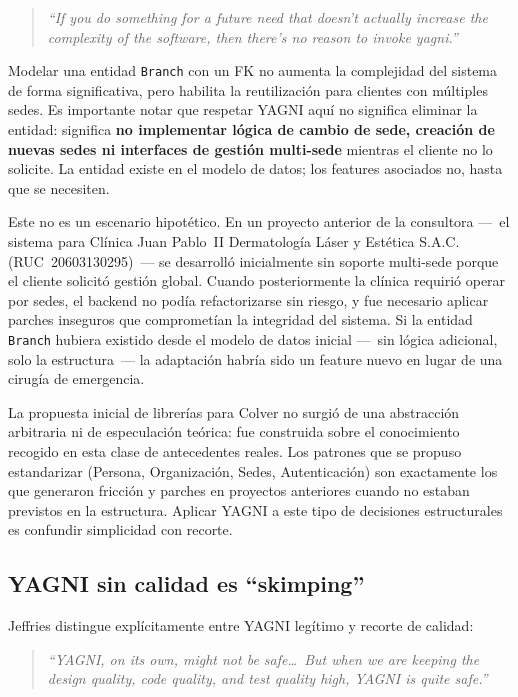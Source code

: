 \documentclass[conference]{IEEEtran}
\begin{document}
\begin{quote}
\textit{``If you do something for a future need that doesn't
actually increase the complexity of the software, then there's no
reason to invoke yagni.''}~\cite{fowler2015yagni}
\end{quote}

Modelar una entidad \texttt{Branch} con un FK no aumenta la
complejidad del sistema de forma significativa, pero habilita la
reutilizaci\'on para clientes con m\'ultiples sedes. Es importante
notar que respetar YAGNI aqu\'i no significa eliminar la entidad:
significa \textbf{no implementar l\'ogica de cambio de sede,
creaci\'on de nuevas sedes ni interfaces de gesti\'on multi-sede}
mientras el cliente no lo solicite. La entidad existe en el modelo
de datos; los features asociados no, hasta que se necesiten.

Este no es un escenario hipot\'etico. En un proyecto anterior de
la consultora ---~el sistema para Cl\'inica Juan Pablo~II
Dermatolog\'ia L\'aser y Est\'etica S.A.C.
(RUC~20603130295)~--- se desarroll\'o inicialmente sin soporte
multi-sede porque el cliente solicit\'o gesti\'on global. Cuando
posteriormente la cl\'inica requiri\'o operar por sedes, el
backend no pod\'ia refactorizarse sin riesgo, y fue necesario
aplicar parches inseguros que compromet\'ian la integridad del
sistema. Si la entidad \texttt{Branch} hubiera existido desde el
modelo de datos inicial ---~sin l\'ogica adicional, solo la
estructura~--- la adaptaci\'on habr\'ia sido un feature nuevo en
lugar de una cirug\'ia de emergencia.

La propuesta inicial de librer\'ias para Colver no surgi\'o de una
abstracci\'on arbitraria ni de especulaci\'on te\'orica: fue
construida sobre el conocimiento recogido en esta clase de
antecedentes reales. Los patrones que se propuso estandarizar
(Persona, Organizaci\'on, Sedes, Autenticaci\'on) son exactamente
los que generaron fricci\'on y parches en proyectos anteriores
cuando no estaban previstos en la estructura. Aplicar YAGNI a
este tipo de decisiones estructurales es confundir simplicidad con
recorte.

\subsection{YAGNI sin calidad es ``skimping''}

Jeffries distingue expl\'icitamente entre YAGNI leg\'itimo y
recorte de calidad:

\begin{quote}
\textit{``YAGNI, on its own, might not be safe\ldots\ But when we
are keeping the design quality, code quality, and test quality
high, YAGNI is quite safe.''}~\cite{jeffries2019}
\end{quote}
\end{document}
